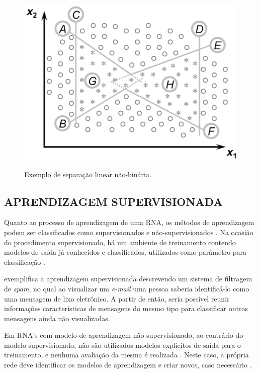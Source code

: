 \begin{figure}[H]
	\caption{Exemplo de separação linear não-binária.}
	\centering %
	\includegraphics[width=12cm]{resources/multilayer_perceptron.png} %
	\label{figura:multilayer_perceptron}	
\end{figure}

\subsection{APRENDIZAGEM SUPERVISIONADA}

Quanto ao processo de aprendizagem de uma RNA, os métodos de aprendizagem podem ser classificados como supervisionados e não-supervisionados \cite{haykin2007redes}. Na ocasião do procedimento supervisionado, há um ambiente de treinamento contendo modelos de saída já conhecidos e classificados, utilizados como parâmetro para classificação \cite{marius2009}.

 exemplifica a aprendizagem supervisionada descrevendo um sistema de filtragem de \textit{spam}, no qual ao visualizar um \textit{e-mail} uma pessoa saberia identificá-lo como uma mensagem de lixo eletrônico. A partir de então, seria possível reunir informações características de mensagens do mesmo tipo para classificar outras mensagens ainda não visualizadas.

Em RNA's com modelo de aprendizagem não-supervisionado, ao contrário do modelo supervisionado, não são utilizados modelos explícitos de saída para o treinamento, e nenhuma avaliação da mesma é realizada \cite{von2005rede}. Neste caso, a própria rede deve identificar os modelos de aprendizagem e criar novos, caso necessário \cite{becker1991}.

